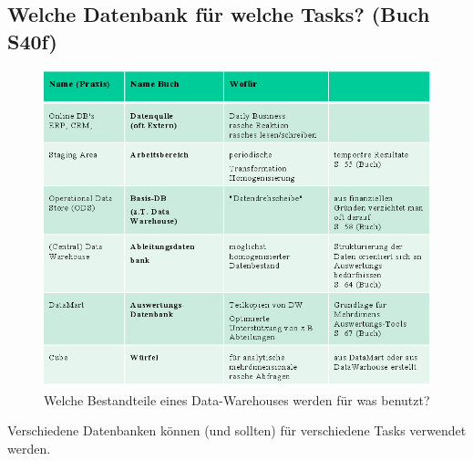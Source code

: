 \documentclass[a4paper, 11pt]{article}
\begin{document}
\newpage

\subsection{Welche Datenbank für welche Tasks? (Buch S40f)}

\begin{figure}[htb]
	\centering
	\includegraphics[keepaspectratio=true,height=18\baselineskip]{bestandteileDW.png}
	\caption{Welche Bestandteile eines Data-Warehouses werden für was benutzt?}
	\label{fig:bestDW}
\end{figure}


Verschiedene Datenbanken können (und sollten) für verschiedene Tasks verwendet werden.

\newpage
\end{document}

